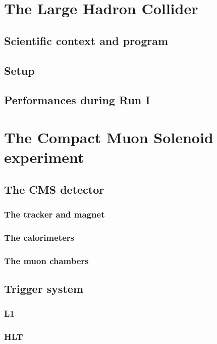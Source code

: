     \section{The Large Hadron Collider}
        \loremipsum
        \subsection{Scientific context and program}
        \loremipsum
        \subsection{Setup}
        \loremipsum
        \subsection{Performances during Run I}
        \loremipsum

    \section{The Compact Muon Solenoid experiment}
        \loremipsum
        \subsection{The CMS detector}
        \loremipsum
            \subsubsection{The tracker and magnet}
        \loremipsum
            \subsubsection{The calorimeters}
        \loremipsum
            \subsubsection{The muon chambers}
        \loremipsum
        \subsection{Trigger system}
        \loremipsum
            \subsubsection{L1}
        \loremipsum
            \subsubsection{HLT}
        \loremipsum
